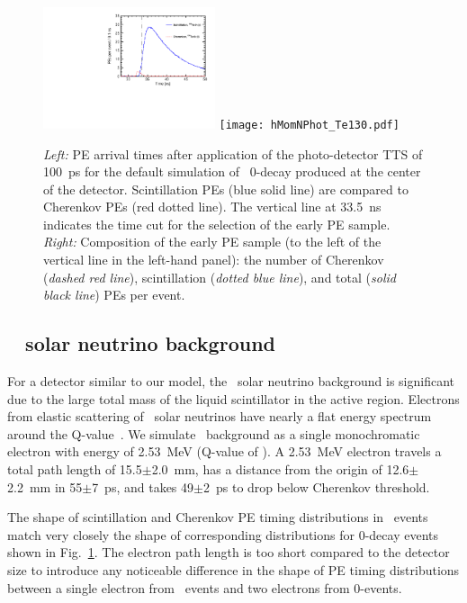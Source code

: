 \begin{figure}[ht]
  \centering
  \includegraphics[width=0.45\textwidth]{hT_Te130_v2.pdf}
\hfil
  \texttt{[image: hMomNPhot\_Te130.pdf]}
  \caption{\emph{Left:} PE arrival times after
    application of the photo-detector TTS of
    100~ps for the default simulation of \Te~0\nbb-decay produced at
    the center of the detector.  Scintillation PEs (blue solid line)
    are compared to Cherenkov PEs (red dotted line). The vertical line
    at 33.5~ns indicates the time cut for the selection of the early
    PE sample.  \emph{Right:} Composition of the early PE sample (to
    the left of the vertical line in the left-hand panel):
    the number of Cherenkov (\emph{dashed red line}), scintillation
    (\emph{dotted blue line}), and total (\emph{solid black line}) PEs
    per event.}
\label{fig:ArrivalTimeDist}
\end{figure}


\subsection{\B~ solar neutrino background}

For a detector similar to our model, the \B~solar neutrino background is
significant due to the large total mass of the liquid scintillator in the
active region.  Electrons from elastic scattering of \B~solar
neutrinos have nearly a flat energy spectrum around the
Q-value~\cite{SNOp-B8-bkg}. We simulate \B~background as a single
monochromatic electron with energy of 2.53~MeV (Q-value of \Te). A
2.53~MeV electron travels a total path length of 15.5$\pm$2.0~mm, has
a distance from the origin of 12.6$\pm$2.2~mm in 55$\pm$7~ps, and
takes 49$\pm$2~ps to drop below Cherenkov threshold.

The shape of scintillation and Cherenkov PE timing distributions in
\B~events match very closely the shape of corresponding distributions
for 0\nbb-decay events shown in Fig.~\ref{fig:ArrivalTimeDist}. The
electron path length is too short compared to the detector size to
introduce any noticeable difference in the shape of PE timing
distributions between a single electron from \B~events and two
electrons from 0\nbb-events. 


